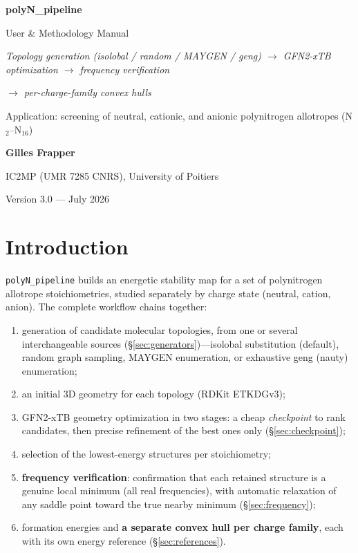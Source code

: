 \documentclass[11pt,a4paper]{article}
\begin{document}
\begin{titlepage}
\centering
\vspace*{2.5cm}
{\Huge\bfseries\color{accent}polyN\_pipeline\par}
\vspace{0.5em}
{\Large User \& Methodology Manual\par}
\vspace{2em}
{\itshape\large Topology generation (isolobal / random / MAYGEN / geng) $\rightarrow$
GFN2-xTB optimization $\rightarrow$ frequency verification\par}
{\itshape\large $\rightarrow$ per-charge-family convex hulls\par}
\vspace{3em}
{\large Application: screening of neutral, cationic, and anionic
polynitrogen allotropes (N$_2$--N$_{16}$)\par}
\vspace{3em}
{\bfseries Gilles Frapper\par}
{\small IC2MP (UMR 7285 CNRS), University of Poitiers\par}
\vfill
{\small\color{gray}Version 3.0 --- July 2026\par}
\end{titlepage}

\tableofcontents
\newpage

\section{Introduction}

\texttt{polyN\_pipeline} builds an energetic stability map for a set of
polynitrogen allotrope stoichiometries, studied separately by charge state
(neutral, cation, anion). The complete workflow chains together:

\begin{enumerate}[itemsep=2pt]
  \item generation of candidate molecular topologies, from one or several
    interchangeable sources (\S\ref{sec:generators})---isolobal
    substitution (default), random graph sampling, MAYGEN enumeration, or exhaustive geng (nauty) enumeration;
  \item an initial 3D geometry for each topology (RDKit ETKDGv3);
  \item GFN2-xTB geometry optimization in two stages: a cheap
    \emph{checkpoint} to rank candidates, then precise refinement of the
    best ones only (\S\ref{sec:checkpoint});
  \item selection of the lowest-energy structures per stoichiometry;
  \item \textbf{frequency verification}: confirmation that each retained
    structure is a genuine local minimum (all real frequencies), with
    automatic relaxation of any saddle point toward the true nearby minimum
    (\S\ref{sec:frequency});
  \item formation energies and \textbf{a separate convex hull per charge
    family}, each with its own energy reference (\S\ref{sec:references}).
\end{enumerate}
\end{document}
